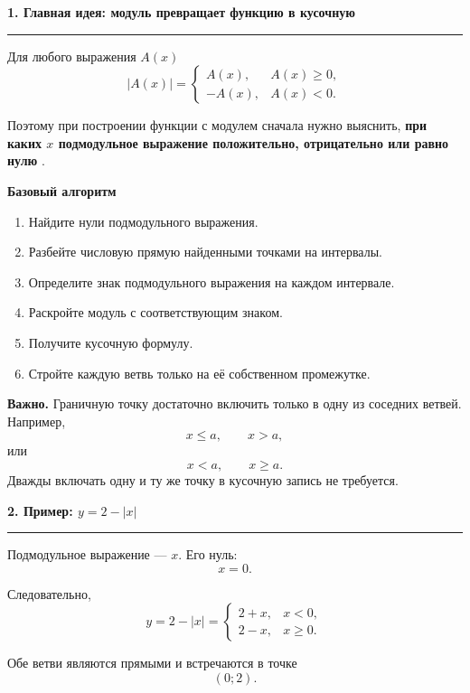 \documentclass[a4paper,12pt]{article}
\newcommand{\lessonsection}[1]{%
    \vspace{0.6em}
    {\Large\bfseries\color{darkaccent}#1}\par
    \vspace{0.15em}
    {\color{softgray}\rule{\linewidth}{0.8pt}}
    \vspace{0.3em}
}
\newcommand{\important}[1]{%
    {\color{darkaccent}\bfseries #1}%
}
\begin{document}
\lessonsection{1. Главная идея: модуль превращает функцию в кусочную}

Для любого выражения \(A(x)\)
\[
|A(x)|=
\begin{cases}
 A(x), & A(x)\ge 0,\\[2mm]
 -A(x), & A(x)<0.
\end{cases}
\]

Поэтому при построении функции с модулем сначала нужно выяснить,
\important{при каких \(x\) подмодульное выражение положительно, отрицательно или равно нулю}.

\textbf{Базовый алгоритм}
\begin{enumerate}
    \item Найдите нули подмодульного выражения.
    \item Разбейте числовую прямую найденными точками на интервалы.
    \item Определите знак подмодульного выражения на каждом интервале.
    \item Раскройте модуль с соответствующим знаком.
    \item Получите кусочную формулу.
    \item Стройте каждую ветвь только на её собственном промежутке.
\end{enumerate}

\textbf{Важно.}
Граничную точку достаточно включить только в одну из соседних ветвей.
Например,
\[
x\le a,\qquad x>a,
\]
или
\[
x<a,\qquad x\ge a.
\]
Дважды включать одну и ту же точку в кусочную запись не требуется.


\lessonsection{2. Пример: \(y=2-|x|\)}

Подмодульное выражение --- \(x\). Его нуль:
\[
x=0.
\]

Следовательно,
\[
y=2-|x|=
\begin{cases}
2+x, & x<0,\\[1mm]
2-x, & x\ge 0.
\end{cases}
\]

Обе ветви являются прямыми и встречаются в точке
\[
(0;2).
\]

\begin{center}
\end{center}
\end{document}
